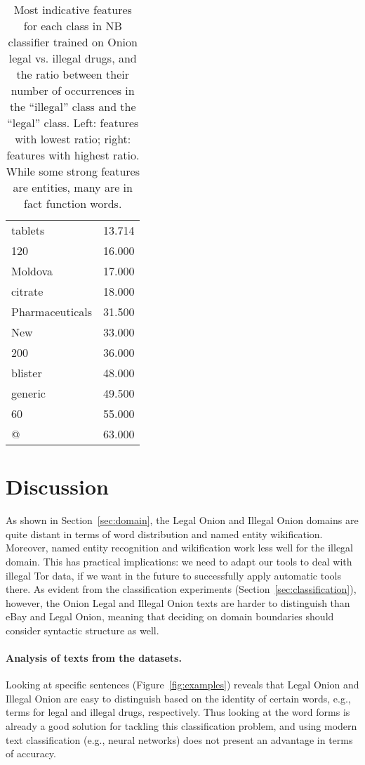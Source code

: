 \documentclass[11pt,a4paper,table]{article}
\begin{document}
\begin{table}[t]
\begin{tabular}{lr}
tablets & 13.714\\
120 & 16.000\\
Moldova & 17.000\\
citrate & 18.000\\
Pharmaceuticals & 31.500\\
New & 33.000\\
200 & 36.000\\
blister & 48.000\\
generic & 49.500\\
60 & 55.000\\
@ & 63.000\\
\end{tabular}
\caption{Most indicative features for each class in NB classifier
trained on Onion legal vs. illegal drugs,
and the ratio between their number of occurrences in the ``illegal''
class and the ``legal'' class.
Left: features with lowest ratio; right: features with highest ratio.
While some strong features are entities, many are in fact function words.
\label{tab:nb_weights}}
\end{table}


\section{Discussion} \label{sec:discussion}

  As shown in Section~\ref{sec:domain}, the Legal Onion and Illegal Onion domains
  are quite distant in terms of word distribution and named entity wikification.
  Moreover, named entity recognition and wikification work less well
  for the illegal domain.
  This has practical implications: we need to adapt our tools to deal with illegal Tor data, if we want in the future to successfully apply automatic tools there.
  As evident from the classification experiments (Section~\ref{sec:classification}), however,
  the Onion Legal and Illegal Onion texts are harder to distinguish than
  eBay and Legal Onion, meaning that deciding on domain boundaries should consider syntactic structure as well.

  \paragraph{Analysis of texts from the datasets.}

    Looking at specific sentences (Figure~\ref{fig:examples})
    reveals that Legal Onion and Illegal Onion are easy to distinguish
    based on the identity of certain words, e.g., terms for legal and illegal drugs,
    respectively.
    Thus looking at the word forms is already a good solution for tackling this
    classification problem,
    and using modern text classification (e.g., neural networks)
    does not present an advantage in
    terms of accuracy.
\end{document}
